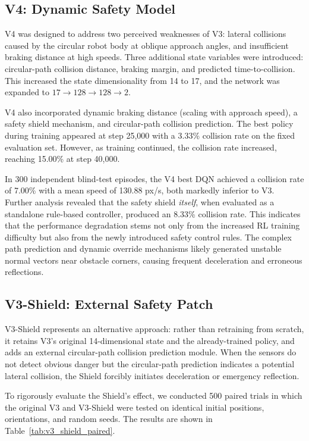 \documentclass[conference]{IEEEtran}
\begin{document}
\subsection{V4: Dynamic Safety Model}

V4 was designed to address two perceived weaknesses of V3: lateral collisions caused by the circular robot body at oblique approach angles, and insufficient braking distance at high speeds. Three additional state variables were introduced: circular-path collision distance, braking margin, and predicted time-to-collision. This increased the state dimensionality from 14 to 17, and the network was expanded to $17 \rightarrow 128 \rightarrow 128 \rightarrow 2$.

V4 also incorporated dynamic braking distance (scaling with approach speed), a safety shield mechanism, and circular-path collision prediction. The best policy during training appeared at step 25,000 with a 3.33\% collision rate on the fixed evaluation set. However, as training continued, the collision rate increased, reaching 15.00\% at step 40,000.

In 300 independent blind-test episodes, the V4 best DQN achieved a collision rate of 7.00\% with a mean speed of 130.88 px/s, both markedly inferior to V3. Further analysis revealed that the safety shield \emph{itself}, when evaluated as a standalone rule-based controller, produced an 8.33\% collision rate. This indicates that the performance degradation stems not only from the increased RL training difficulty but also from the newly introduced safety control rules. The complex path prediction and dynamic override mechanisms likely generated unstable normal vectors near obstacle corners, causing frequent deceleration and erroneous reflections.

\subsection{V3-Shield: External Safety Patch}

V3-Shield represents an alternative approach: rather than retraining from scratch, it retains V3's original 14-dimensional state and the already-trained policy, and adds an external circular-path collision prediction module. When the sensors do not detect obvious danger but the circular-path prediction indicates a potential lateral collision, the Shield forcibly initiates deceleration or emergency reflection.

To rigorously evaluate the Shield's effect, we conducted 500 paired trials in which the original V3 and V3-Shield were tested on identical initial positions, orientations, and random seeds. The results are shown in Table~\ref{tab:v3_shield_paired}.
\end{document}
